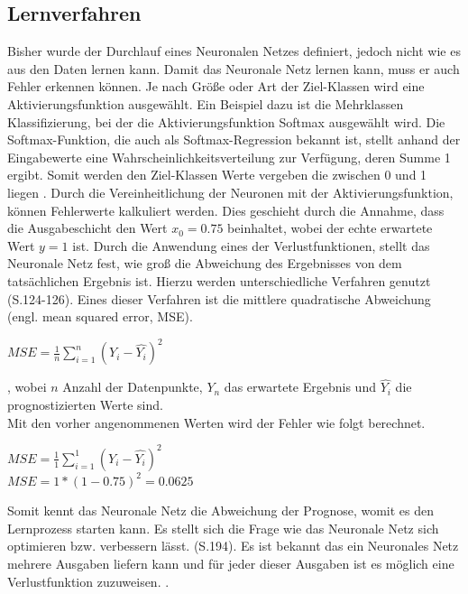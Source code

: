 \documentclass[12pt]{scrreprt}
\begin{document}
\subsection{Lernverfahren}\label{chapter:Lernverfahren}
Bisher wurde der Durchlauf eines Neuronalen Netzes definiert, jedoch nicht wie es aus den Daten lernen kann. Damit das Neuronale Netz lernen kann, muss er auch Fehler erkennen können. Je nach Größe oder Art der Ziel-Klassen wird eine Aktivierungsfunktion ausgewählt. Ein Beispiel dazu ist die Mehrklassen Klassifizierung, bei der die Aktivierungsfunktion Softmax ausgewählt wird. Die Softmax-Funktion, die auch als Softmax-Regression bekannt ist, stellt anhand der Eingabewerte eine Wahrscheinlichkeitsverteilung zur Verfügung, deren Summe 1 ergibt. Somit werden den Ziel-Klassen Werte vergeben die zwischen 0 und 1 liegen \cite{Mahmood2018}. Durch die Vereinheitlichung der Neuronen mit der Aktivierungsfunktion, können Fehlerwerte kalkuliert werden. Dies geschieht durch die Annahme, dass die Ausgabeschicht den Wert $x_{0} = 0.75$ beinhaltet, wobei der echte erwartete Wert $y = 1$ ist. Durch die Anwendung  eines der Verlustfunktionen, stellt das Neuronale Netz fest, wie groß die Abweichung des Ergebnisses von dem tatsächlichen Ergebnis ist. Hierzu werden unterschiedliche Verfahren genutzt  \cite{Matzka2021}(S.124-126). Eines dieser Verfahren ist die mittlere quadratische Abweichung (engl. mean squared error, MSE).

\begin{center}
	\centering
	$MSE = \frac{1}{n} \sum\limits_{i=1}^{n}(Y_{i} - \hat{Y_{i}})^{2}$
\end{center}

, wobei $n$ Anzahl der Datenpunkte, $Y_{n}$ das erwartete Ergebnis und $\hat{Y_{i}}$ die prognostizierten Werte sind.\\

Mit den vorher angenommenen Werten wird der Fehler wie folgt berechnet.

\begin{center}
	$MSE = \frac{1}{1} \sum\limits_{i=1}^{1}(Y_{i} - \hat{Y_{i}})^{2}$\\

	$MSE = 1 * (1 - 0.75)^{2} = 0.0625$\\
\end{center}

Somit kennt das Neuronale Netz die Abweichung der Prognose, womit es den Lernprozess starten kann. Es stellt sich die Frage wie das Neuronale Netz sich optimieren bzw. verbessern lässt. \cite{Plaue2021} (S.194).  Es ist bekannt das ein Neuronales Netz mehrere Ausgaben liefern kann und für jeder dieser Ausgaben ist es möglich eine Verlustfunktion zuzuweisen. \cite{Chollet2018}.
\end{document}
